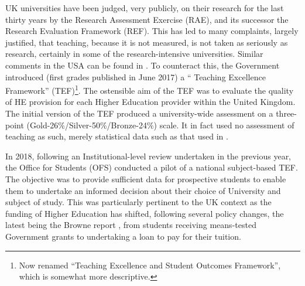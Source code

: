 \documentclass[sigconf,anonymous]{acmart}
\begin{document}
UK universities have been judged, very publicly, on their research
for the last thirty years by the Research Assessment Exercise (RAE), and its successor the Research Evaluation Framework (REF). This has led to many complaints, largely justified, that teaching, because it is not measured, is not taken as seriously as research, certainly in some of the research-intensive universities. Similar comments in the USA can be found in \cite{Campbelletal2018a}. To counteract this, the Government introduced (first grades published in June 2017) a `` Teaching Excellence Framework'' (TEF)\footnote{Now renamed ``Teaching Excellence and Student Outcomes Framework'', which is somewhat more descriptive.}. The ostensible aim of the TEF was to evaluate the quality of HE provision for each Higher Education provider within the United Kingdom.
The initial version of the TEF produced a university-wide assessment on a three-point (Gold-26\%/Silver-50\%/Bronze-24\%) scale. It in fact used no assessment of teaching as such, merely statistical data such as that used in \cite{Shadbolt2016a}.

In 2018, following an Institutional-level review undertaken in the previous year, the Office for Students (OFS) conducted a pilot of a national  subject-based TEF. The objective was to provide sufficient data for prospective students to enable them to undertake an informed decision about their choice of University and subject of study. This was particularly pertinent to the UK context as the funding of Higher Education has shifted, following several policy changes, the latest being the
Browne report \cite{BIS2010a}, from students receiving means-tested Government grants to undertaking a loan to pay for their tuition. %

\end{document}
